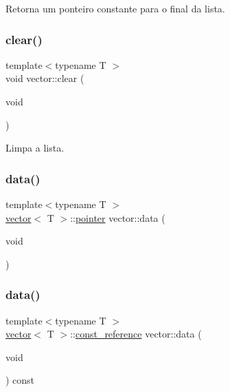 Retorna um ponteiro constante para o final da lista. 

\mbox{\label{classsc_1_1vector_a72d20c72613053a3f4bcf2e8e0a9da71}} 
\subsubsection{\texorpdfstring{clear()}{clear()}}
{\footnotesize\ttfamily template$<$typename T $>$ \\
void vector\+::clear (\begin{DoxyParamCaption}\item[{void}]{ }\end{DoxyParamCaption})}



Limpa a lista. 

\mbox{\label{classsc_1_1vector_a8c08600b61d36dd7f76c93f199fbf142}} 
\subsubsection{\texorpdfstring{data()}{data()}\hspace{0.1cm}{\footnotesize\ttfamily [1/2]}}
{\footnotesize\ttfamily template$<$typename T $>$ \\
\hyperlink{classsc_1_1vector}{vector}$<$ T $>$\+::\hyperlink{classsc_1_1vector_a0348a6e1e249e051964a2bc94b05527a}{pointer} vector\+::data (\begin{DoxyParamCaption}\item[{void}]{ }\end{DoxyParamCaption})}

\mbox{\label{classsc_1_1vector_a91112807482b4d0f6e13096063263eb5}} 
\subsubsection{\texorpdfstring{data()}{data()}\hspace{0.1cm}{\footnotesize\ttfamily [2/2]}}
{\footnotesize\ttfamily template$<$typename T $>$ \\
\hyperlink{classsc_1_1vector}{vector}$<$ T $>$\+::\hyperlink{classsc_1_1vector_a8da2b1a11b069241100f9b2e14f481a0}{const\+\_\+reference} vector\+::data (\begin{DoxyParamCaption}\item[{void}]{ }\end{DoxyParamCaption}) const}

